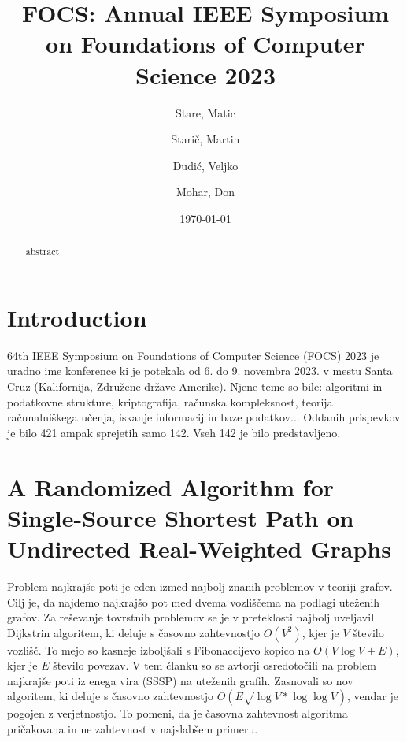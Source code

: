 \documentclass{article}
\title{FOCS: Annual IEEE Symposium on Foundations of Computer Science 2023}
\author{
  Stare, Matic\\
  \and
  Starič, Martin\\
  \and
  Dudić, Veljko\\
  \and
  Mohar, Don
}
\date{\today}
\begin{document}
\maketitle

\tableofcontents
\newpage


\begin{abstract}
    abstract
\end{abstract}



\section{Introduction}
64th IEEE Symposium on Foundations of Computer Science (FOCS) 2023 je uradno ime konference ki je potekala od 6. do 9. novembra 2023. v mestu Santa Cruz (Kalifornija, Združene države Amerike). Njene teme so bile: algoritmi in podatkovne strukture, kriptografija, računska kompleksnost, teorija računalniškega učenja, iskanje informacij in baze podatkov... Oddanih prispevkov je bilo 421 ampak sprejetih samo 142. Vseh 142 je bilo predstavljeno.

\section{A Randomized Algorithm for Single-Source Shortest Path on Undirected Real-Weighted Graphs}

Problem najkrajše poti je eden izmed najbolj znanih problemov v teoriji grafov. Cilj je, da najdemo najkrajšo pot med dvema vozliščema na podlagi uteženih grafov. Za reševanje tovrstnih problemov se je v preteklosti najbolj uveljavil Dijkstrin algoritem, ki deluje s časovno zahtevnostjo $O(V^2)$, kjer je $V$ število vozlišč. To mejo so kasneje izboljšali s Fibonaccijevo kopico na $O(V \log V + E)$, kjer je $E$ število povezav. V tem članku so se avtorji osredotočili na problem najkrajše poti iz enega vira (SSSP) na uteženih grafih. Zasnovali so nov algoritem, ki deluje s časovno zahtevnostjo $O(E \sqrt{\log V * \log \log V})$, vendar je pogojen z verjetnostjo. To pomeni, da je časovna zahtevnost algoritma pričakovana in ne zahtevnost v najslabšem primeru. 
\end{document}

